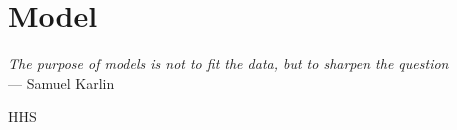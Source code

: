 \chapter{Model}\label{ch:model} 

\begin{flushright}{\slshape
    The purpose of models is not to fit the data, but to sharpen the question} \\ \medskip
    --- Samuel Karlin
\end{flushright}
\ac{HHS}
